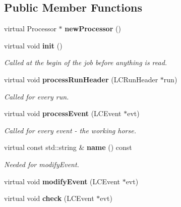 \subsection*{Public Member Functions}
\begin{DoxyCompactItemize}
\item 
virtual Processor $\ast$ {\bfseries newProcessor} ()\label{classmarlin_1_1RunInfoProcessor_ab8aa029e7fee27866206787f322b3616}

\item 
virtual void {\bf init} ()
\begin{DoxyCompactList}\small\item\em Called at the begin of the job before anything is read. \item\end{DoxyCompactList}\item 
virtual void {\bf processRunHeader} (LCRunHeader $\ast$run)\label{classmarlin_1_1RunInfoProcessor_a037d6642c5effd5ea57ef2d3dec2ce47}

\begin{DoxyCompactList}\small\item\em Called for every run. \item\end{DoxyCompactList}\item 
virtual void {\bf processEvent} (LCEvent $\ast$evt)\label{classmarlin_1_1RunInfoProcessor_a44b26122c6d673c48d5c2e0dfc5a10fd}

\begin{DoxyCompactList}\small\item\em Called for every event -\/ the working horse. \item\end{DoxyCompactList}\item 
virtual const std::string \& {\bf name} () const \label{classmarlin_1_1RunInfoProcessor_a4e0b06142a6fe83a607f8fbbfc5f3a07}

\begin{DoxyCompactList}\small\item\em Needed for modifyEvent. \item\end{DoxyCompactList}\item 
virtual void {\bfseries modifyEvent} (LCEvent $\ast$evt)\label{classmarlin_1_1RunInfoProcessor_a87835b19afc2566d1edf358c49060243}

\item 
virtual void {\bfseries check} (LCEvent $\ast$evt)\label{classmarlin_1_1RunInfoProcessor_a13101be4c139383d19a2578cac39fc21}


\end{DoxyCompactItemize}
